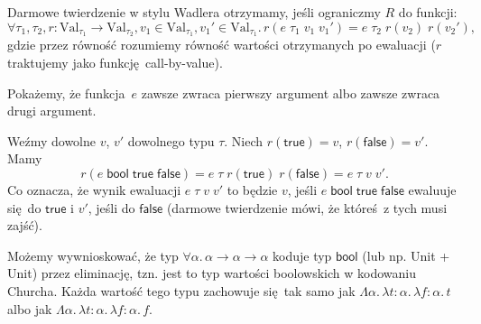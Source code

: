\documentclass[a4paper, 12pt]{article}
\newcommand{\Val}{\mathrm{Val}}
\newcommand{\bool}{\mathsf{bool}}
\newcommand{\true}{\mathsf{true}}
\newcommand{\false}{\mathsf{false}}
\begin{document}
Darmowe twierdzenie w stylu Wadlera otrzymamy, jeśli ograniczmy $R$ do funkcji:
$$∀τ_1,τ_2,r\colon \Val_{τ_1} → \Val_{τ_2}, v_1 ∈ \Val_{τ_1}, v_1' ∈ \Val_{τ_1}.\,
r(e\;τ_1\;v_1\;v_1') = e\;τ_2\;r(v_2)\;r(v_2'),$$
gdzie przez równość rozumiemy równość wartości otrzymanych po ewaluacji ($r$ traktujemy
jako funkcję call-by-value).

Pokażemy, że funkcja $e$ zawsze zwraca pierwszy argument albo zawsze zwraca drugi argument.

Weźmy dowolne $v$, $v'$ dowolnego typu $τ$.
Niech $r(\true) = v$, $r(\false) = v'$.
Mamy
$$r(e\;\bool\;\true\;\false) = e\;τ\;r(\true)\;r(\false) = e\;τ\;v\;v'.$$
Co oznacza, że wynik ewaluacji $e\;τ\;v\;v'$ to będzie $v$, jeśli
$e\;\bool\;\true\;\false$ ewaluuje się do $\true$ i $v'$, jeśli do $\false$
(darmowe twierdzenie mówi, że któreś z tych musi zajść).

Możemy wywnioskować, że typ $∀α.\,α→α→α$ koduje typ $\bool$ (lub np. \textsf{Unit + Unit}) przez eliminację,
tzn. jest to typ wartości boolowskich w kodowaniu Churcha.
Każda wartość tego typu zachowuje się tak samo jak $Λα.\,λt{:}α.\,λf{:}α.\,t$ albo jak $Λα.\,λt{:}α.\,λf{:}α.\,f$.
\end{document}

